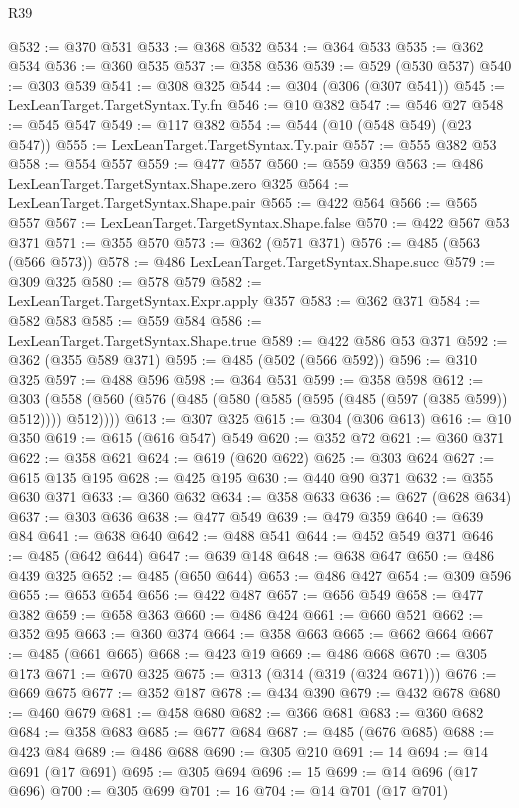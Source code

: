 \begin{lexlean}{R39}
\begin{coremodule}
@532 := @370 @531
@533 := @368 @532
@534 := @364 @533
@535 := @362 @534
@536 := @360 @535
@537 := @358 @536
@539 := @529 (@530 @537)
@540 := @303 @539
@541 := @308 @325
@544 := @304 (@306 (@307 @541))
@545 := LexLeanTarget.TargetSyntax.Ty.fn
@546 := @10 @382
@547 := @546 @27
@548 := @545 @547
@549 := @117 @382
@554 := @544 (@10 (@548 @549) (@23 @547))
@555 := LexLeanTarget.TargetSyntax.Ty.pair
@557 := @555 @382 @53
@558 := @554 @557
@559 := @477 @557
@560 := @559 @359
@563 := @486 LexLeanTarget.TargetSyntax.Shape.zero @325
@564 := LexLeanTarget.TargetSyntax.Shape.pair
@565 := @422 @564
@566 := @565 @557
@567 := LexLeanTarget.TargetSyntax.Shape.false
@570 := @422 @567 @53 @371
@571 := @355 @570
@573 := @362 (@571 @371)
@576 := @485 (@563 (@566 @573))
@578 := @486 LexLeanTarget.TargetSyntax.Shape.succ
@579 := @309 @325
@580 := @578 @579
@582 := LexLeanTarget.TargetSyntax.Expr.apply @357
@583 := @362 @371
@584 := @582 @583
@585 := @559 @584
@586 := LexLeanTarget.TargetSyntax.Shape.true
@589 := @422 @586 @53 @371
@592 := @362 (@355 @589 @371)
@595 := @485 (@502 (@566 @592))
@596 := @310 @325
@597 := @488 @596
@598 := @364 @531
@599 := @358 @598
@612 := @303 (@558 (@560 (@576 (@485 (@580 (@585 (@595 (@485 (@597 (@385 @599)) @512)))) @512))))
@613 := @307 @325
@615 := @304 (@306 @613)
@616 := @10 @350
@619 := @615 (@616 @547) @549
@620 := @352 @72
@621 := @360 @371
@622 := @358 @621
@624 := @619 (@620 @622)
@625 := @303 @624
@627 := @615 @135 @195
@628 := @425 @195
@630 := @440 @90 @371
@632 := @355 @630 @371
@633 := @360 @632
@634 := @358 @633
@636 := @627 (@628 @634)
@637 := @303 @636
@638 := @477 @549
@639 := @479 @359
@640 := @639 @84
@641 := @638 @640
@642 := @488 @541
@644 := @452 @549 @371
@646 := @485 (@642 @644)
@647 := @639 @148
@648 := @638 @647
@650 := @486 @439 @325
@652 := @485 (@650 @644)
@653 := @486 @427
@654 := @309 @596
@655 := @653 @654
@656 := @422 @487
@657 := @656 @549
@658 := @477 @382
@659 := @658 @363
@660 := @486 @424
@661 := @660 @521
@662 := @352 @95
@663 := @360 @374
@664 := @358 @663
@665 := @662 @664
@667 := @485 (@661 @665)
@668 := @423 @19
@669 := @486 @668
@670 := @305 @173
@671 := @670 @325
@675 := @313 (@314 (@319 (@324 @671)))
@676 := @669 @675
@677 := @352 @187
@678 := @434 @390
@679 := @432 @678
@680 := @460 @679
@681 := @458 @680
@682 := @366 @681
@683 := @360 @682
@684 := @358 @683
@685 := @677 @684
@687 := @485 (@676 @685)
@688 := @423 @84
@689 := @486 @688
@690 := @305 @210
@691 := 14
@694 := @14 @691 (@17 @691)
@695 := @305 @694
@696 := 15
@699 := @14 @696 (@17 @696)
@700 := @305 @699
@701 := 16
@704 := @14 @701 (@17 @701)

\end{coremodule}
\end{lexlean}
